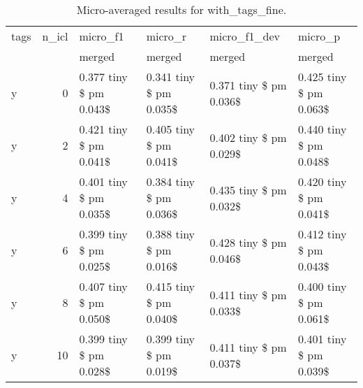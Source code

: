 \begin{table}
\caption{Micro-averaged results for with_tags_fine.}
\label{results_micro}
\begin{tabular}{lrllll}
\toprule
tags & n\_icl & micro\_f1 & micro\_r & micro\_f1\_dev & micro\_p \\
 &  & merged & merged & merged & merged \\
\midrule
y & 0 & 0.377 tiny \$ pm 0.043\$ & 0.341 tiny \$ pm 0.035\$ & 0.371 tiny \$ pm 0.036\$ & 0.425 tiny \$ pm 0.063\$ \\
y & 2 & 0.421 tiny \$ pm 0.041\$ & 0.405 tiny \$ pm 0.041\$ & 0.402 tiny \$ pm 0.029\$ & 0.440 tiny \$ pm 0.048\$ \\
y & 4 & 0.401 tiny \$ pm 0.035\$ & 0.384 tiny \$ pm 0.036\$ & 0.435 tiny \$ pm 0.032\$ & 0.420 tiny \$ pm 0.041\$ \\
y & 6 & 0.399 tiny \$ pm 0.025\$ & 0.388 tiny \$ pm 0.016\$ & 0.428 tiny \$ pm 0.046\$ & 0.412 tiny \$ pm 0.043\$ \\
y & 8 & 0.407 tiny \$ pm 0.050\$ & 0.415 tiny \$ pm 0.040\$ & 0.411 tiny \$ pm 0.033\$ & 0.400 tiny \$ pm 0.061\$ \\
y & 10 & 0.399 tiny \$ pm 0.028\$ & 0.399 tiny \$ pm 0.019\$ & 0.411 tiny \$ pm 0.037\$ & 0.401 tiny \$ pm 0.039\$ \\
\bottomrule
\end{tabular}
\end{table}
